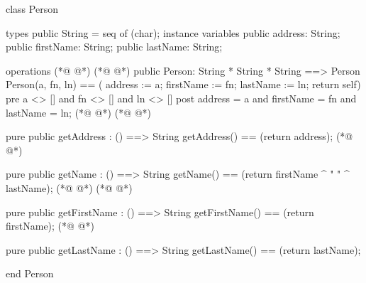 \begin{vdmpp}[breaklines=true]
class Person

types
 public String = seq of (char);
instance variables
  public address: String;
  public firstName: String;
  public lastName: String;
  
operations
(*@
\label{Patient:11}
@*)
(*@
\label{Person:11}
@*)
 public Person: String * String * String ==> Person
  Person(a, fn, ln) == ( address := a; firstName := fn; lastName := ln; return self)
 pre a <> [] and fn <> [] and ln <> []
 post address = a and firstName = fn and lastName = ln;
(*@
\label{getHealthNumber:15}
@*)
(*@
\label{getAddress:15}
@*)
 
 pure public getAddress : () ==> String
  getAddress() == (return address);
(*@
\label{getName:18}
@*)
  
 pure public getName : () ==> String
  getName() == (return firstName ^ " " ^ lastName);
(*@
\label{getfirstName:21}
@*)
(*@
\label{getFirstName:21}
@*)
  
 pure public getFirstName : () ==> String
  getFirstName() == (return firstName);
(*@
\label{getLastName:24}
@*)
  
 pure public getLastName : () ==> String
  getLastName() == (return lastName);

end Person
\end{vdmpp}
